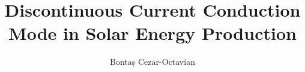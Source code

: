 \documentclass[a4paper,11pt]{scrreprt}                       %
\def \chapters {./chapters}      														 %
\begin{document}

\title{Discontinuous Current Conduction Mode in Solar Energy Production}					    %
\author{Bontaș Cezar-Octavian}																				%

\maketitle


\tableofcontents
\printnoidxglossaries																				%
\listoffigures
{}
\listoftables
{}
\listofalgorithmes
{}

\clearpage









%    

\cleardoublepage

\printbibliography[heading=bibintoc]
\end{document}

